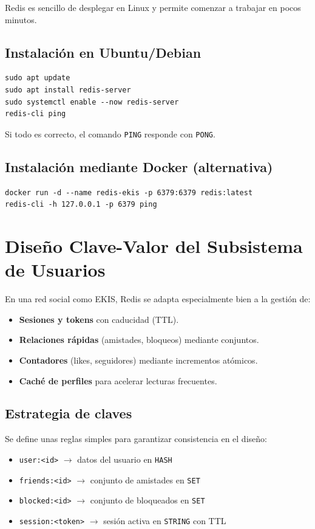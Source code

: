 Redis es sencillo de desplegar en Linux y permite comenzar a trabajar en pocos minutos.

\subsection{Instalación en Ubuntu/Debian}
\begin{verbatim}
sudo apt update
sudo apt install redis-server
sudo systemctl enable --now redis-server
redis-cli ping
\end{verbatim}

Si todo es correcto, el comando \texttt{PING} responde con \texttt{PONG}.

\subsection{Instalación mediante Docker (alternativa)}
\begin{verbatim}
docker run -d --name redis-ekis -p 6379:6379 redis:latest
redis-cli -h 127.0.0.1 -p 6379 ping
\end{verbatim}

\section{Diseño Clave-Valor del Subsistema de Usuarios}

En una red social como EKIS, Redis se adapta especialmente bien a la gestión de:
\begin{itemize}
    \item \textbf{Sesiones y tokens} con caducidad (TTL).
    \item \textbf{Relaciones rápidas} (amistades, bloqueos) mediante conjuntos.
    \item \textbf{Contadores} (likes, seguidores) mediante incrementos atómicos.
    \item \textbf{Caché de perfiles} para acelerar lecturas frecuentes.
\end{itemize}

\subsection{Estrategia de claves}
Se define unas reglas simples para garantizar consistencia en el diseño:
\begin{itemize}
    \item \texttt{user:<id>} $\rightarrow$ datos del usuario en \texttt{HASH}
    \item \texttt{friends:<id>} $\rightarrow$ conjunto de amistades en \texttt{SET}
    \item \texttt{blocked:<id>} $\rightarrow$ conjunto de bloqueados en \texttt{SET}
    \item \texttt{session:<token>} $\rightarrow$ sesión activa en \texttt{STRING} con TTL
\end{itemize}

